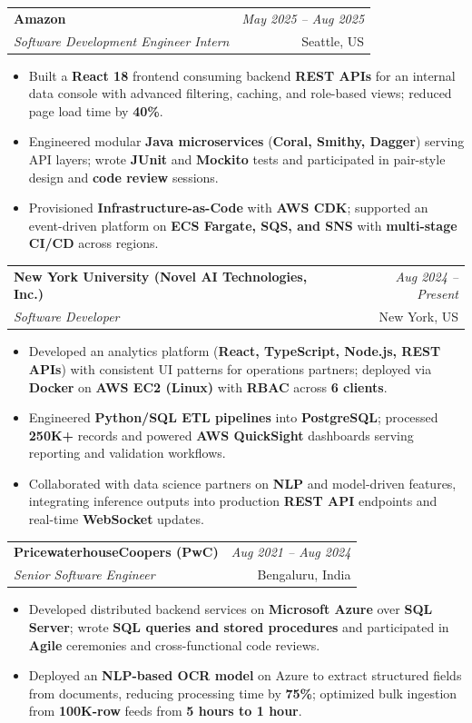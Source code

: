 \documentclass[a4paper,10pt]{article}
\makeatletter
\newcommand{\resumeSubheading}[4]{
\vspace{0.3mm}\item
    \begin{tabular*}{0.98\textwidth}[t]{l@{\extracolsep{\fill}}r}
        \textbf{#1} & \textit{\footnotesize{#4}} \\
        \textit{\footnotesize{#3}} & \footnotesize{#2}\\
    \end{tabular*}\vspace{-2mm}
}
\newcommand{\resumeItemListStart}{\begin{itemize}[leftmargin=*, labelsep=1mm, itemsep=0pt]}
\newcommand{\resumeItemListEnd}{\end{itemize}\vspace{-2mm}}
\makeatother
\begin{document}
\resumeSubheading
{Amazon}{Seattle, US}
{Software Development Engineer Intern}{May 2025 -- Aug 2025}
\resumeItemListStart
\item \footnotesize{Built a \textbf{React 18} frontend consuming backend \textbf{REST APIs} for an internal data console with advanced filtering, caching, and role-based views; reduced page load time by \textbf{40\%}.}
\item \footnotesize{Engineered modular \textbf{Java microservices} (\textbf{Coral, Smithy, Dagger}) serving API layers; wrote \textbf{JUnit} and \textbf{Mockito} tests and participated in pair-style design and \textbf{code review} sessions.}
\item \footnotesize{Provisioned \textbf{Infrastructure-as-Code} with \textbf{AWS CDK}; supported an event-driven platform on \textbf{ECS Fargate, SQS, and SNS} with \textbf{multi-stage CI/CD} across regions.}
\resumeItemListEnd

\resumeSubheading
{New York University (Novel AI Technologies, Inc.)}{New York, US}
{Software Developer}{Aug 2024 -- Present}
\resumeItemListStart
\item \footnotesize{Developed an analytics platform (\textbf{React, TypeScript, Node.js, REST APIs}) with consistent UI patterns for operations partners; deployed via \textbf{Docker} on \textbf{AWS EC2 (Linux)} with \textbf{RBAC} across \textbf{6 clients}.}
\item \footnotesize{Engineered \textbf{Python/SQL ETL pipelines} into \textbf{PostgreSQL}; processed \textbf{250K+} records and powered \textbf{AWS QuickSight} dashboards serving reporting and validation workflows.}
\item \footnotesize{Collaborated with data science partners on \textbf{NLP} and model-driven features, integrating inference outputs into production \textbf{REST API} endpoints and real-time \textbf{WebSocket} updates.}
\resumeItemListEnd

\resumeSubheading
{PricewaterhouseCoopers (PwC)}{Bengaluru, India}
{Senior Software Engineer}{Aug 2021 -- Aug 2024}
\resumeItemListStart
\item \footnotesize{Developed distributed backend services on \textbf{Microsoft Azure} over \textbf{SQL Server}; wrote \textbf{SQL queries and stored procedures} and participated in \textbf{Agile} ceremonies and cross-functional code reviews.}
\item \footnotesize{Deployed an \textbf{NLP-based OCR model} on Azure to extract structured fields from documents, reducing processing time by \textbf{75\%}; optimized bulk ingestion from \textbf{100K-row} feeds from \textbf{5 hours to 1 hour}.}
\resumeItemListEnd
\end{document}
